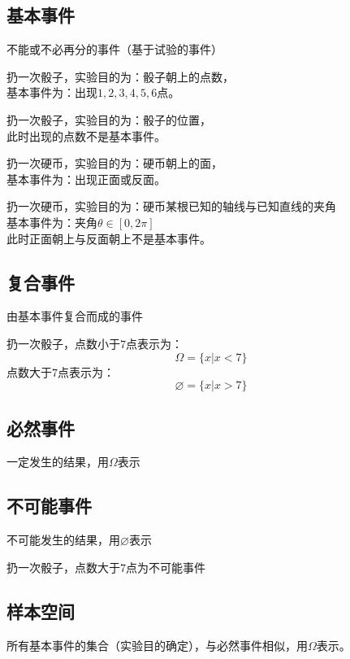 \subsection{基本事件}%
\label{sub:基本事件}
不能或不必再分的事件（基于试验的事件）
\begin{eg}
	扔一次骰子，实验目的为：骰子朝上的点数，\\
	基本事件为：出现$1,2,3,4,5,6$点。
\end{eg}
\begin{eg}
	扔一次骰子，实验目的为：骰子的位置，\\
	此时出现的点数不是基本事件。
\end{eg}
\begin{eg}
	扔一次硬币，实验目的为：硬币朝上的面，\\
	基本事件为：出现正面或反面。
\end{eg}
\begin{eg}
	扔一次硬币，实验目的为：硬币某根已知的轴线与已知直线的夹角\\
	基本事件为：夹角$\theta\in [0,2\pi]$\\
	此时正面朝上与反面朝上不是基本事件。
\end{eg}
\subsection{复合事件}%
\label{sub:复合事件}
由基本事件复合而成的事件
\begin{eg}
	扔一次骰子，点数小于$7$点表示为：
	$$
	\Omega=\{x|x<7\}
	$$
	点数大于$7$点表示为：
	$$
	\varnothing=\{x|x>7\}
	$$
\end{eg}
\subsection{必然事件}%
\label{sub:必然事件}
一定发生的结果，用$\Omega$表示
\subsection{不可能事件}%
\label{sub:不可能事件}
不可能发生的结果，用$\varnothing$表示
\begin{eg}
	扔一次骰子，点数大于$7$点为不可能事件
\end{eg}
\subsection{样本空间}%
\label{sub:样本空间}
所有基本事件的集合（实验目的确定），与必然事件相似，用$\Omega$表示。
